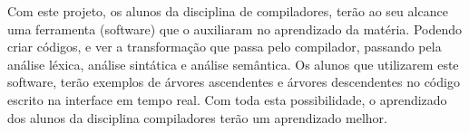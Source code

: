 \documentclass[12pt,oneside,a4paper,chapter=TITLE,section=TITLE,sumario=tradicional]{abntex2}
\begin{document}
Com este projeto, os alunos da disciplina de compiladores, terão ao seu alcance uma ferramenta (software) que o auxiliaram no aprendizado da matéria. Podendo criar códigos, e ver a transformação que passa pelo compilador, passando pela análise léxica, análise sintática e análise semântica. Os alunos que utilizarem este software, terão exemplos de árvores ascendentes e árvores descendentes no código escrito na interface em tempo real. Com toda esta possibilidade, o aprendizado dos alunos da disciplina compiladores terão um aprendizado melhor.
\begin{comment}
O aprendizado na área de compiladores é difícil, por conta da disciplina ter grande volume de conteúdo teórico, pouca pratica e apenas 6 meses de ensino, para o aluno compreender seus conceitos e analisar o passo a passo do compilador. Um interpretador desenvolvido da linguagem D+, auxilia os alunos na absorção do conteúdo, ajudando-os a fixar melhor a matéria da disciplina de compiladores, pois seria a implementação, no desenvolvimento de um compilador. Após inserir um código na interface, o interpretador compilará linha por linha ilustrando o código objeto. Caso exista um erro semântico ou alguma palavra especial esteja incorreta, de forma léxica ou de forma sintática, terá uma destaque com uma cor. O objetivo deste trabalho é desenvolver uma ferramenta que vai aplicar conteúdos visto em sala de aula na prática, proporcionando ao aluno entender como eles são elaborados 
dentro dos processos de analise léxica e sintática, ilustrando a saída do código em cada etapa das análises. Outra justificativa se dá na área de documentação, os materiais disponíveis sobre o funcionamento, desenvolvimento e aplicação de interpretadores são escassos. Desta forma, o estudo proposto documentará o desenvolvimento de um interpretador com a gramática da linguagem D+, relatando as dificuldades encontradas e soluções obtidas, para ajudar no entendimento do tema.
6.2. Problema Proposto: Com o desenvolvimento do interpretador da linguagem D+, pode-se questionar: • Como é possível criar um interpretador? • É possível tem uma melhor compreensão do processo de compilação, mostrando a entrada do código e saída de cada análise? • Como é possível mostrar de forma clara os erros de compilação do programa, de forma a auxiliar o programador a solucionar seus erros? • É possível criar uma interface funcional para um interpretador? • É possível que a criação de um interpretador para a linguagem D+ auxilie o aluno a entendê-la melhor? 
 
6.3. Objetivos: O objetivo principal deste projeto é a criação de um interpretador da linguagem D+, que executará junto a uma interface desenvolvida para facilitar o aprendizado do estudante. Objetivos específicos: • Compilar um código desenvolvido em tempo real; • Ilustrar a saída dos estágios de análise léxica e análise sintática. • Caso o código tenha algum erro de análise léxica ou análise sintática, mostrar em tempo real ao desenvolvedor o erro; • Facilitar o entendimento para alunos que estejam estudando compiladores; • Criar a documentação do funcionamento do interpretador
\end{comment}
\end{document}
